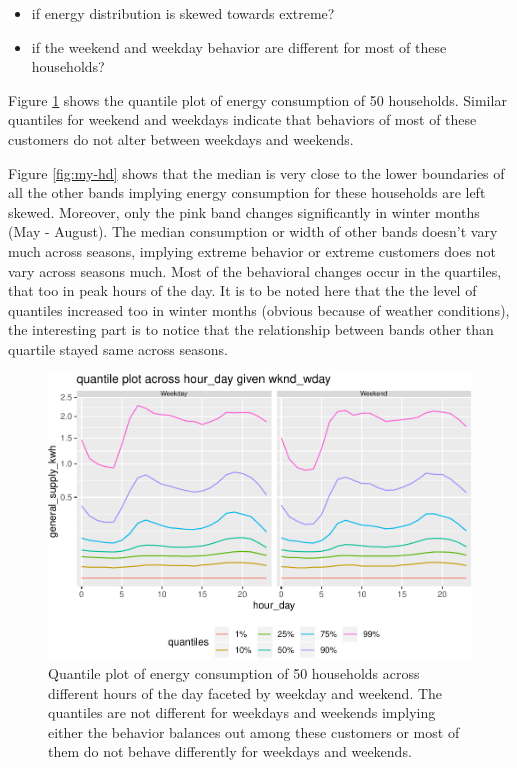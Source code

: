 \documentclass[12pt]{article}
\begin{document}
\begin{itemize}
\item
  if energy distribution is skewed towards extreme?
\item
  if the weekend and weekday behavior are different for most of these
  households?
\end{itemize}

Figure \ref{fig:wknd-wday50} shows the quantile plot of energy
consumption of 50 households. Similar quantiles for weekend and weekdays
indicate that behaviors of most of these customers do not alter between
weekdays and weekends.

Figure \ref{fig:my-hd} shows that the median is very close to the lower
boundaries of all the other bands implying energy consumption for these
households are left skewed. Moreover, only the pink band changes
significantly in winter months (May - August). The median consumption or
width of other bands doesn't vary much across seasons, implying extreme
behavior or extreme customers does not vary across seasons much. Most of
the behavioral changes occur in the quartiles, that too in peak hours of
the day. It is to be noted here that the the level of quantiles
increased too in winter months (obvious because of weather conditions),
the interesting part is to notice that the relationship between bands
other than quartile stayed same across seasons.

\begin{figure}

{\centering \includegraphics[width=\textwidth]{figure/wknd-wday50-1} 

}

\caption{Quantile plot of energy consumption of 50 households across different hours of the day faceted by weekday and weekend. The quantiles are not different for weekdays and weekends implying either the behavior balances out among these customers or most of them do not behave differently for weekdays and weekends.}\label{fig:wknd-wday50}
\end{figure}
\end{document}
